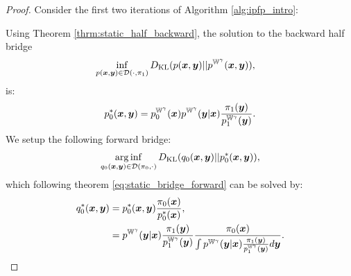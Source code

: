 \documentclass[a4paper,12pt,twoside,openright]{report}
\theoremstyle{definition}
\begin{document}
\begin{proof}
Consider the first two iterations of Algorithm \ref{alg:ipfp_intro}:

Using Theorem \ref{thrm:static_half_backward}, the solution to the backward half bridge
 \begin{align}
        \inf_{p({\bm{x}},{\bm{y}}) \in {\mathcal{D}}( \cdot, \pi_1)} D_{\mathrm{KL}}  &(p({\bm{x}},{\bm{y}}) || p^{\mathbb{W}^{\gamma}}({\bm{x}},{\bm{y}})), \nonumber 
\end{align}
is:
\begin{align}
    p_0^{*} ({\bm{x}}, {\bm{y}}) = p^{\mathbb{W}^{\gamma}}_0({\bm{x}}) p^{\mathbb{W}^{\gamma}}({\bm{y}}| {\bm{x}}) \frac{\pi_1({\bm{y}})}{p^{\mathbb{W}^{\gamma}}_1({\bm{y}})}.
\end{align}
We setup the following forward bridge:
\begin{align}
    \operatorname*{arg\,inf}_{q_0({\bm{x}}, {\bm{y}})  \in {\mathcal{D}}(\pi_0 , \cdot)}D_{\mathrm{KL}} (q_0({\bm{x}}, {\bm{y}}) ||p_0^{*} ({\bm{x}}, {\bm{y}})),
\end{align}
which following theorem \ref{eq:static_bridge_forward} can be solved by:
\begingroup
\allowdisplaybreaks
\begin{align}
    q_0^{*} ({\bm{x}}, {\bm{y}}) &= p_0^{*} ({\bm{x}}, {\bm{y}}) \frac{\pi_0({\bm{x}})}{p_0^{*} ({\bm{x}})} ,\\
 &=  p^{\mathbb{W}^{\gamma}}({\bm{y}}| {\bm{x}}) \frac{\pi_1({\bm{y}})}{p^{\mathbb{W}^{\gamma}}_1({\bm{y}})} \frac{\pi_0({\bm{x}})}{\int   p^{\mathbb{W}^{\gamma}}({\bm{y}}| {\bm{x}}) \frac{\pi_1({\bm{y}})}{p^{\mathbb{W}^{\gamma}}_1({\bm{y}})} d{\bm{y}}}.
\end{align}
\endgroup


\end{proof}
\end{document}
